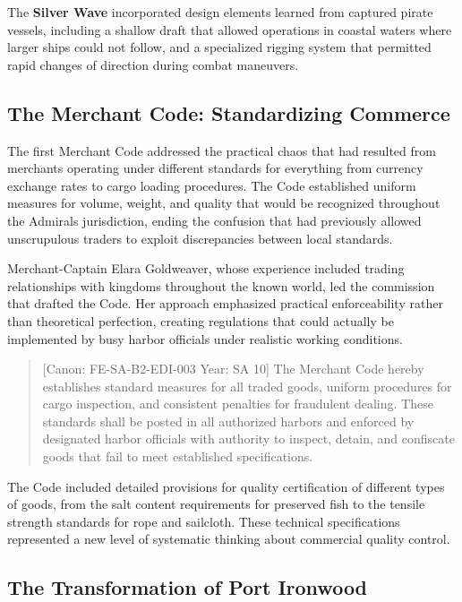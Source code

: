 The \textbf{Silver Wave} incorporated design elements learned from
captured pirate vessels, including a shallow draft that allowed
operations in coastal waters where larger ships could not follow, and a
specialized rigging system that permitted rapid changes of direction
during combat maneuvers.

\subsection{The Merchant Code: Standardizing
Commerce}\label{the-merchant-code-standardizing-commerce}

The first Merchant Code addressed the practical chaos that had resulted
from merchants operating under different standards for everything from
currency exchange rates to cargo loading procedures. The Code
established uniform measures for volume, weight, and quality that would
be recognized throughout the Admiral\textquotesingle s jurisdiction,
ending the confusion that had previously allowed unscrupulous traders to
exploit discrepancies between local standards.

Merchant-Captain Elara Goldweaver, whose experience included trading
relationships with kingdoms throughout the known world, led the
commission that drafted the Code. Her approach emphasized practical
enforceability rather than theoretical perfection, creating regulations
that could actually be implemented by busy harbor officials under
realistic working conditions.

\begin{quote}
{[}Canon: FE-SA-B2-EDI-003 \textbar{} Year: SA 10{]} The Merchant Code
hereby establishes standard measures for all traded goods, uniform
procedures for cargo inspection, and consistent penalties for fraudulent
dealing. These standards shall be posted in all authorized harbors and
enforced by designated harbor officials with authority to inspect,
detain, and confiscate goods that fail to meet established
specifications.
\end{quote}

The Code included detailed provisions for quality certification of
different types of goods, from the salt content requirements for
preserved fish to the tensile strength standards for rope and sailcloth.
These technical specifications represented a new level of systematic
thinking about commercial quality control.

\subsection{The Transformation of Port
Ironwood}\label{the-transformation-of-port-ironwood}

